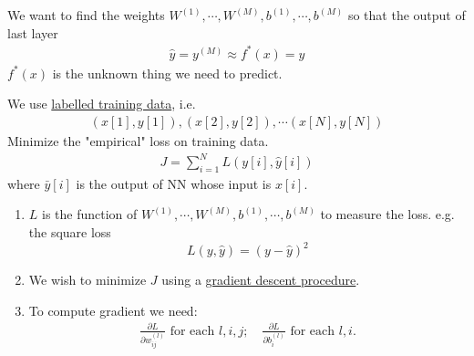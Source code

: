 \documentclass[11pt,a4paper]{article}
\begin{document}
We want to find the weights $W^{(1)},\cdots,W^{(M)},b^{(1)},\cdots,b^{(M)}$ so that the output of last layer
\begin{equation}
    \begin{aligned}
        \hat{y}=y^{(M)}\approx f^*(x)=y
    \end{aligned}
    \nonumber
\end{equation}
$f^*(x)$ is the unknown thing we need to predict.

We use \underline{labelled training data}, i.e.
\begin{equation}
    \begin{aligned}
        (x[1],y[1]),(x[2],y[2]),\cdots (x[N],y[N])
    \end{aligned}
    \nonumber
\end{equation}
Minimize the "empirical" loss on training data.
\begin{equation}
    \begin{aligned}
        J=\sum_{i=1}^N L(y[i],\hat{y}[i])
    \end{aligned}
    \nonumber
\end{equation}
where $\bar{y}[i]$ is the output of NN whose input is $x[i]$.

\begin{enumerate}[$\bullet$]
    \item $L$ is the function of $W^{(1)},\cdots,W^{(M)},b^{(1)},\cdots,b^{(M)}$ to measure the loss. e.g. the square loss $$L(y,\hat{y})=(y-\hat{y})^2$$
    \item We wish to minimize $J$ using a \underline{gradient descent procedure}.
    \item To compute gradient we need:
    \begin{equation}
        \begin{aligned}
            \frac{\partial L}{\partial w_{ij}^{(l)}}\text{ for each }l,i,j; \quad
            \frac{\partial L}{\partial b_i^{(l)}}\text{ for each }l,i.\\
        \end{aligned}
        \nonumber
    \end{equation}
\end{enumerate}
\end{document}
